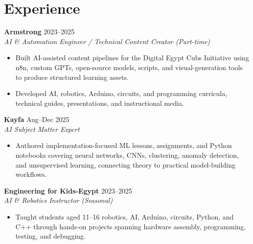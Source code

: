 \documentclass[letterpaper]{article}
\newcommand{\roleline}[3]{\textbf{#1} \hfill #2 \\\textit{#3} \\}
\begin{document}
\section*{Experience}
\roleline{Armstrong}{2023--2025}{AI \& Automation Engineer / Technical Content Creator (Part-time)}
\begin{itemize}
\item Built AI-assisted content pipelines for the Digital Egypt Cubs Initiative using n8n, custom GPTs, open-source models, scripts, and visual-generation tools to produce structured learning assets.
\item Developed AI, robotics, Arduino, circuits, and programming curricula, technical guides, presentations, and instructional media.
\end{itemize}
\roleline{Kayfa}{Aug--Dec 2025}{AI Subject Matter Expert}
\begin{itemize}
\item Authored implementation-focused ML lessons, assignments, and Python notebooks covering neural networks, CNNs, clustering, anomaly detection, and unsupervised learning, connecting theory to practical model-building workflows.
\end{itemize}
\roleline{Engineering for Kids-Egypt}{2023--2025}{AI \& Robotics Instructor (Seasonal)}
\begin{itemize}
\item Taught students aged 11--16 robotics, AI, Arduino, circuits, Python, and C++ through hands-on projects spanning hardware assembly, programming, testing, and debugging.
\end{itemize}
\end{document}
